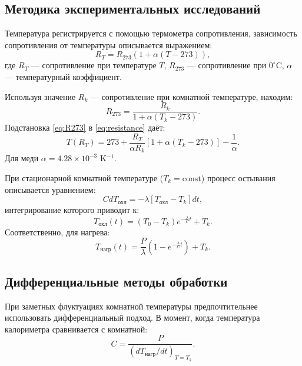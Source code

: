 \documentclass[a4paper,12pt]{article}
\begin{document}
\subsection{Методика экспериментальных исследований}
Температура регистрируется с помощью термометра сопротивления, зависимость сопротивления от температуры описывается выражением:
\begin{equation}
    R_T = R_{273}(1 + \alpha(T - 273)),
    \label{eq:resistance}
\end{equation}
где $R_T$ — сопротивление при температуре $T$, $R_{273}$ — сопротивление при $0^\circ$C, $\alpha$ — температурный коэффициент.

Используя значение $R_k$ — сопротивление при комнатной температуре, находим:
\begin{equation}
    R_{273} = \frac{R_k}{1 + \alpha(T_k - 273)}.
    \label{eq:R273}
\end{equation}
Подстановка \eqref{eq:R273} в \eqref{eq:resistance} даёт:
\begin{equation}
    T(R_T) = 273 + \frac{R_T}{\alpha R_k} [1 + \alpha(T_k - 273)] - \frac{1}{\alpha}.
    \label{eq:T_from_R}
\end{equation}
Для меди $\alpha = 4.28 \times 10^{-3}$ K$^{-1}$.

При стационарной комнатной температуре ($T_k = \text{const}$) процесс остывания описывается уравнением:
\begin{equation}
    C dT_{\text{охл}} = -\lambda[T_{\text{охл}} - T_k] dt,
    \label{eq:cool_diff}
\end{equation}
интегрирование которого приводит к:
\begin{equation}
    T_{\text{охл}}(t) = (T_0 - T_k) e^{-\frac{\lambda}{C} t} + T_k.
    \label{eq:cool_exp}
\end{equation}
Соответственно, для нагрева:
\begin{equation}
    T_{\text{нагр}}(t) = \frac{P}{\lambda} \left(1 - e^{-\frac{\lambda}{C} t}\right) + T_k.
    \label{eq:heat_exp}
\end{equation}

\subsection{Дифференциальные методы обработки}
При заметных флуктуациях комнатной температуры предпочтительнее использовать дифференциальный подход. В момент, когда температура калориметра сравнивается с комнатной:
\begin{equation}
    C = \frac{P}{(dT_{\text{нагр}}/dt)_{T=T_k}}.
    \label{eq:diff_C}
\end{equation}
\end{document}
